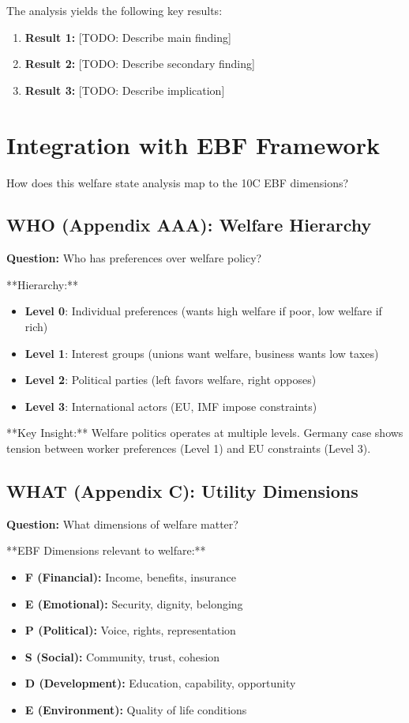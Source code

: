 The analysis yields the following key results:

\begin{enumerate}
    \item \textbf{Result 1:} [TODO: Describe main finding]
    \item \textbf{Result 2:} [TODO: Describe secondary finding]
    \item \textbf{Result 3:} [TODO: Describe implication]
\end{enumerate}

\section{Integration with EBF Framework}
\label{sec:ebf-integration}

How does this welfare state analysis map to the 10C EBF dimensions?

\subsection{WHO (Appendix AAA): Welfare Hierarchy}

\textbf{Question:} Who has preferences over welfare policy?

**Hierarchy:**
\begin{itemize}
\item \textbf{Level 0}: Individual preferences (wants high welfare if poor, low welfare if rich)
\item \textbf{Level 1}: Interest groups (unions want welfare, business wants low taxes)
\item \textbf{Level 2}: Political parties (left favors welfare, right opposes)
\item \textbf{Level 3}: International actors (EU, IMF impose constraints)
\end{itemize}

**Key Insight:** Welfare politics operates at multiple levels. Germany case shows tension between worker preferences (Level 1) and EU constraints (Level 3).

\subsection{WHAT (Appendix C): Utility Dimensions}

\textbf{Question:} What dimensions of welfare matter?

**EBF Dimensions relevant to welfare:**
\begin{itemize}
\item \textbf{F (Financial):} Income, benefits, insurance
\item \textbf{E (Emotional):} Security, dignity, belonging
\item \textbf{P (Political):} Voice, rights, representation
\item \textbf{S (Social):} Community, trust, cohesion
\item \textbf{D (Development):} Education, capability, opportunity
\item \textbf{E (Environment):} Quality of life conditions
\end{itemize}

